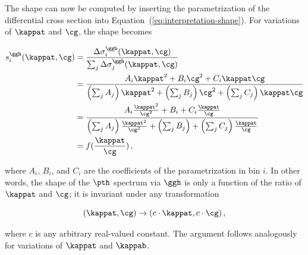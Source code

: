 The shape can now be computed by inserting the parametrization of the differential cross section into Equation~(\ref{eq:interpretation-shape}).
% 
For variations of $\kappat$ and $\cg$, the shape becomes
% 
\begin{linenomath*}
\begin{equation}
\label{eq:interpretation-shape-ktcg}
\begin{split}
s^{\ggh}_i(\kappat, \cg)
        &=
        \frac
            {\Delta\sigma^{\ggh}_i(\kappat, \cg)}
            {\sum_j \Delta\sigma^{\ggh}_j(\kappat, \cg)}
            \\
        &=
        \frac
            {A_i \kappat^2 + B_i \cg^2 + C_i \kappat \cg}
            {
                \left(\sum_j A_j\right) \kappat^2
                + \left(\sum_j B_j\right) \cg^2
                + \left(\sum_j C_j\right) \kappat\cg
                }
            \\
        &= 
        \frac
            {A_i \frac{\kappat^2}{\cg^2} + B_i + C_i \frac{\kappat}{\cg}}
            {
                \left(\sum_j A_j\right) \frac{\kappat^2}{\cg^2}
                + \left(\sum_j B_j\right) 
                + \left(\sum_j C_j\right) \frac{\kappat}{\cg}
                }
            \\
        & = f(\frac{\kappat}{\cg})
\,,
\end{split}
\end{equation}
\end{linenomath*}
% 
where $A_i$, $B_i$, and $C_i$ are the coefficients of the parametrization in bin $i$.
% 
In other words, the shape of the $\pth$ spectrum via $\ggh$ is only a function of the ratio of $\kappat$ and $\cg$; it is invariant under any transformation
% 
\begin{linenomath*}
\begin{equation}
\label{eq:interpretation-ktcg-transform}
(\kappat, \cg) \to (c \cdot \kappat, c \cdot \cg)
\,,
\end{equation}
\end{linenomath*}
% 
where $c$ is any arbitrary real-valued constant.
% 
The argument follows analogously for variations of $\kappat$ and $\kappab$.


